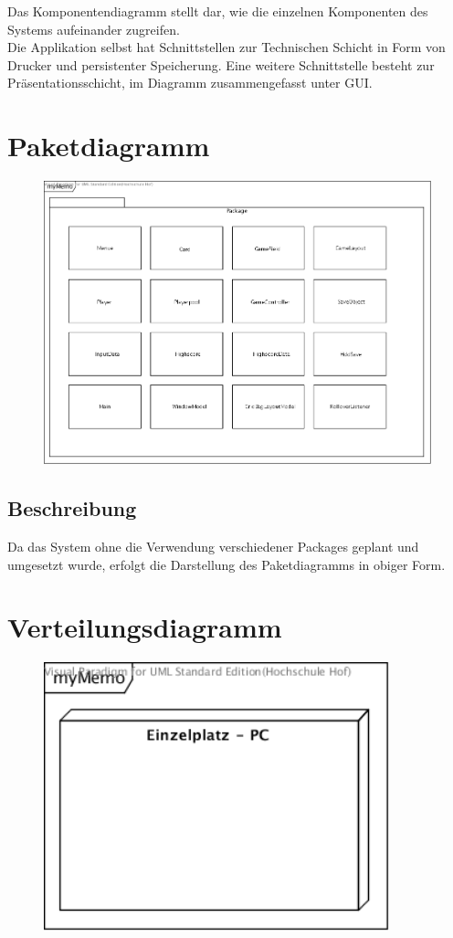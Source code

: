 Das Komponentendiagramm stellt dar, wie die einzelnen Komponenten des Systems aufeinander zugreifen.\\
Die Applikation selbst hat Schnittstellen zur Technischen Schicht in Form von Drucker und persistenter Speicherung. Eine weitere Schnittstelle besteht zur Präsentationsschicht, im Diagramm zusammengefasst unter GUI.



\clearpage
\section{Paketdiagramm}

\begin{figure}[!h]
	\centering
    \includegraphics[width=\textwidth]{./paketdiagramm.png}
	\label{layout_gesamt}
\end{figure}
\subsection{Beschreibung}
Da das System ohne die Verwendung verschiedener Packages geplant und umgesetzt wurde, erfolgt die Darstellung des Paketdiagramms in obiger Form.


\clearpage
\section{Verteilungsdiagramm}

\begin{figure}[!h]
	\centering
    \includegraphics[width=10cm]{./verteilungsdiagramm.png}
	\label{layout_gesamt}
\end{figure}
